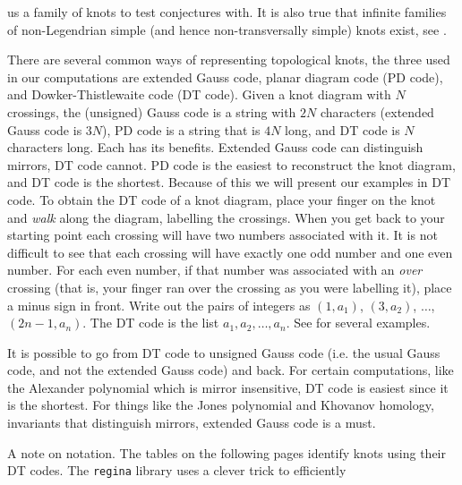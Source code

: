 \documentclass{article}
\theoremstyle{plain}
\begin{document}
        us a family of knots to test conjectures with. It is also true that
        infinite families of non-Legendrian simple (and hence
        non-transversally simple) knots exist,
        see \cite{vfoldvari2019legnonsimple}.
        \par\hfill\par
        There are several common ways of representing topological knots, the
        three used in our computations are extended Gauss code, planar diagram
        code (PD code), and Dowker-Thistlewaite code (DT code). Given a knot
        diagram with $N$ crossings, the (unsigned) Gauss code is a string with $2N$
        characters (extended Gauss code is $3N$),
        PD code is a string that is $4N$ long, and DT code is $N$
        characters long. Each has its benefits. Extended Gauss code
        can distinguish mirrors, DT code cannot. PD code is the easiest to
        reconstruct the knot diagram, and DT code is the shortest. Because of
        this we will present our examples in DT code. To obtain the DT code of
        a knot diagram, place your finger on the knot and \textit{walk} along
        the diagram, labelling the crossings. When you get back to your starting
        point each crossing will have two numbers associated with it. It is
        not difficult to see that each crossing will have exactly one odd number
        and one even number. For each even number, if that number was associated
        with an \textit{over} crossing (that is, your finger ran over the
        crossing as you were labelling it), place a minus sign in front. Write
        out the pairs of integers as $(1,a_{1})$, $(3,a_{2})$, $\dots$,
        $(2n-1,a_{n})$. The DT code is the list $a_{1},a_{2},\dots,a_{n}$.
        See \cite{KatlasDTCode} for several examples.
        \par\hfill\par
        It is possible to go from DT code to unsigned
        Gauss code (i.e. the usual Gauss code, and not the extended Gauss code)
        and back. For certain computations, like the Alexander polynomial which
        is mirror insensitive, DT code is easiest since it is the shortest.
        For things like the Jones polynomial and Khovanov homology, invariants
        that distinguish mirrors, extended Gauss code is a must.
        \par\hfill\par
        A note on notation. The tables on the following pages identify knots using their DT
        codes. The \texttt{regina} library \cite{regina} uses a clever trick to efficiently
\end{document}
